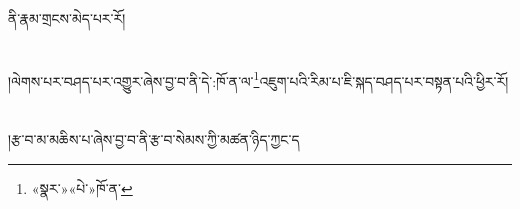 ནི་རྣམ་གྲངས་མེད་པར་རོ།\chapter{ }།ལེགས་པར་བཤད་པར་འགྱུར་ཞེས་བྱ་བ་ནི་དེ་:ཁོ་ན་ལ་\footnote{«སྣར་»«པེ་»ཁོ་ན་}འཇུག་པའི་རིམ་པ་ཇི་སྐད་བཤད་པར་བསྟན་པའི་ཕྱིར་རོ།\chapter{ }།རྩ་བ་མ་མཆིས་པ་ཞེས་བྱ་བ་ནི་རྩ་བ་སེམས་ཀྱི་མཚན་ཉིད་ཀྱང་ད
